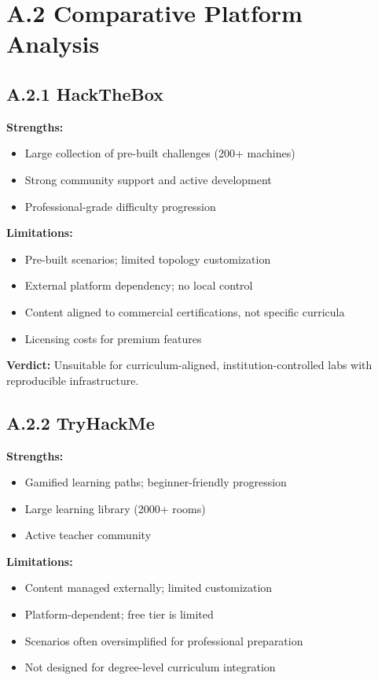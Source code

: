 \section*{A.2 Comparative Platform Analysis}


\subsection*{A.2.1 HackTheBox}


\textbf{Strengths:}
\begin{itemize}
    \item Large collection of pre-built challenges (200+ machines)
    \item Strong community support and active development
    \item Professional-grade difficulty progression
\end{itemize}


\textbf{Limitations:}
\begin{itemize}
    \item Pre-built scenarios; limited topology customization
    \item External platform dependency; no local control
    \item Content aligned to commercial certifications, not specific curricula
    \item Licensing costs for premium features
\end{itemize}


\textbf{Verdict:} Unsuitable for curriculum-aligned, institution-controlled labs with reproducible infrastructure.


\subsection*{A.2.2 TryHackMe}


\textbf{Strengths:}
\begin{itemize}
    \item Gamified learning paths; beginner-friendly progression
    \item Large learning library (2000+ rooms)
    \item Active teacher community
\end{itemize}


\textbf{Limitations:}
\begin{itemize}
    \item Content managed externally; limited customization
    \item Platform-dependent; free tier is limited
    \item Scenarios often oversimplified for professional preparation
    \item Not designed for degree-level curriculum integration
\end{itemize}


